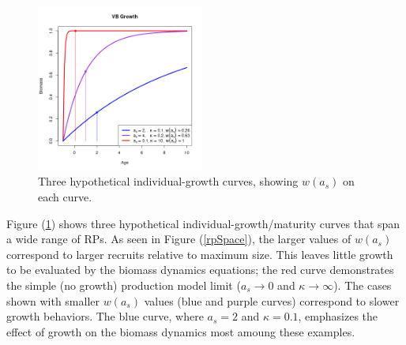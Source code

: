\begin{figure}
\vspace{-1.5cm}
\includegraphics[width=0.49\textwidth]{../ddBias/vbCurves.png}
\vspace{-1cm}
\caption{Three hypothetical individual-growth curves, showing $w(a_s)$ on each curve.}\label{vbCurves}
\end{figure}
%
Figure (\ref{vbCurves}) shows three hypothetical individual-growth/maturity curves 
that span a wide range of RPs. As seen in Figure (\ref{rpSpace}), the larger values of
$w(a_s)$ correspond to larger recruits relative to maximum size. This leaves little growth 
to be evaluated by the biomass dynamics equations; the red curve demonstrates the
simple (no growth) production model limit ($a_s\rightarrow0$ and $\kappa\rightarrow\infty$).
The cases shown with smaller $w(a_s)$ values (blue and purple curves) correspond to slower growth %
behaviors. The blue curve, where $a_s=2$ and $\kappa=0.1$, emphasizes the effect of growth 
on the biomass dynamics most amoung these examples. 

